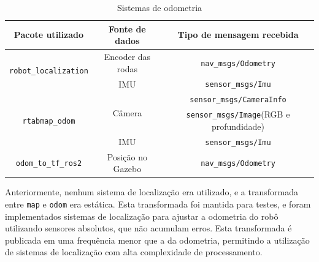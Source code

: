 \documentclass[repeatfields,xlists,xpacks,oneside,yearsonly]{ufrgscca}
\begin{document}

\begin{table}[h]
    \begin{center}
        \caption{Sistemas de odometria}
        \label{tab:odometria}
        \begin{tabular}{c|c|c}
            Pacote utilizado                              & Fonte de dados          & Tipo de mensagem recebida                       \\
            \hline
            \multirow{2}{*}{\texttt{robot\_localization}} & Encoder das rodas       & \texttt{nav\_msgs/Odometry}                     \\
                                                          & IMU                     & \texttt{sensor\_msgs/Imu}                       \\
            \hline
            \multirow{3}{*}{\texttt{rtabmap\_odom}}       & \multirow{2}{*}{Câmera} & \texttt{sensor\_msgs/CameraInfo}                \\
                                                          &                         & \texttt{sensor\_msgs/Image}(RGB e profundidade) \\
                                                          & IMU                     & \texttt{sensor\_msgs/Imu}                       \\
            \hline
            \texttt{odom\_to\_tf\_ros2}                   & Posição no Gazebo       & \texttt{nav\_msgs/Odometry}                     \\
        \end{tabular}
    \end{center}
\end{table}

Anteriormente, nenhum sistema de localização era utilizado, e a transformada
entre \texttt{map} e \texttt{odom} era estática.
Esta transformada foi mantida para testes, e foram implementados sistemas
de localização para ajustar a odometria do robô utilizando sensores absolutos,
que não acumulam erros.
Esta transformada é publicada em uma frequência menor que a da odometria,
permitindo a utilização de sistemas de localização com alta complexidade de
processamento.
\end{document}
